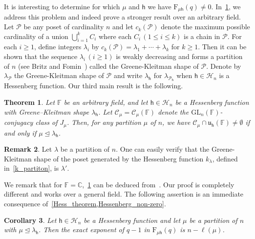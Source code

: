 \documentclass[12pt,a4paper,reqno]{amsart}
\theoremstyle{plain}
\newtheorem{theorem}{Theorem}[section]
\newtheorem{corollary}[theorem]{Corollary}
\theoremstyle{definition}
\newtheorem{definition}[theorem]{Definition}
\newtheorem{remark}[theorem]{Remark}
\newcommand{\less}{\unlhd}
\newcommand{\FF}{{\mathbb{F}}}
\newcommand{\1}{\mathds{1}}
\newcommand{\GL}{\mathrm{GL}}
\newcommand{\F}{\mathrm{F}}
\renewcommand{\u}{\mathfrak{u}}
\newcommand{\hes}{\mathsf{h}}
\begin{document}
It is interesting to determine for which $\mu$ and $\hes$ we have  $\F_{\mu\hes}(q)\neq 0$. In~\cref{Hessenberg_non-zero}, we address this problem and indeed prove a stronger result over an arbitrary field.  Let $\mathcal{P}$ be any poset of cardinality $n$ and let $c_k(\mathcal{P})$ denote the maximum possible cardinality of a union $\bigcup_{i=1}^k C_i$ where each $C_i\, (1\leq i\leq k)$ is a chain in $\mathcal{P}$. For each $i\geq 1$, define integers $\lambda_i$ by $c_k(\mathcal{P})=\lambda_1+\cdots +\lambda_k$ for $k\geq 1$. Then it can be shown that the sequence $\lambda_i\, (i\geq 1)$ is weakly decreasing and forms a partition of $n$ (see Britz and Fomin~\cite[Theorem 2.1]{MR1814900}) called the Greene-Kleitman shape of $\mathcal{P}$.  
Denote by $\lambda_\mathcal{P}$ the Greene-Kleitman shape of $\mathcal{P}$ and write $\lambda_\hes$ for $\lambda_{\mathcal{P}_\hes}$ when $\hes\in\mathcal{H}_n$ is a Hessenberg function. 
Our third main result is the following.
\begin{theorem}\label{Hessenberg_non-zero} Let $\FF$ be an arbitrary field, and let $\hes \in \mathcal{H}_n$ be a Hessenberg function with Greene–Kleitman shape $\lambda_\hes$. 
Let $\mathcal C_\mu=\mathcal C_\mu(\FF)$ denote the $\GL_n(\FF)$-conjugacy class of $J_\mu$. 
Then, for any partition $\mu$ of $n$, we have $\mathcal{C}_\mu \cap \u_\hes(\FF) \neq \emptyset$ if and only if $\mu \less \lambda_\hes$.
\end{theorem}
\begin{remark}\label{Hesenberg_partition} Let $\lambda$ be a partition of $n$. One can easily verify that the Greene-Kleitman shape of the poset generated by the Hessenberg function $k_\lambda$, defined in~\cref{k_partiton}, is $\lambda'$.   
\end{remark}  
 
We remark that for $\FF=\mathbb C$,~\cref{Hessenberg_non-zero} can be deduced from~\cite{MR4334164}. Our proof is completely different and works over a general field. 
The following assertion is an immediate consequence of~\cref{Hess_theorem,Hessenberg_non-zero}.
\begin{corollary}
\label{cor:n-ell}
 Let $\hes\in\mathcal{H}_n$ be a Hessenberg function and let $\mu$ be a partition of $n$ with $\mu\less \lambda_\hes$. Then the exact exponent of $q-1$ in $\F_{\mu\hes}(q)$ is $n-\ell(\mu)$.
\end{corollary}
\end{document}
